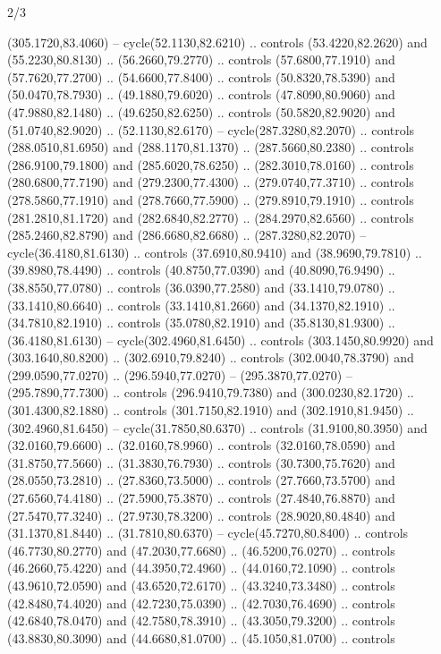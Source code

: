 \begin{flagdescription}{2/3}
\begin{scope}[xshift=0.5\flaglength,yshift=0.5\flagwidth,scale=\stretchfactor]
\begin{scope}[scale=0.001645\flagwidth,yshift=65mm,xshift=-63mm]
\begin{scope}[y=0.80pt, x=0.80pt, yscale=-1,]
\begin{scope}[cm={{1.33333,0.0,0.0,1.33333,(0.0,1e-05)}}]
  (305.1720,83.4060) -- cycle(52.1130,82.6210) .. controls (53.4220,82.2620) and
  (55.2230,80.8130) .. (56.2660,79.2770) .. controls (57.6800,77.1910) and
  (57.7620,77.2700) .. (54.6600,77.8400) .. controls (50.8320,78.5390) and
  (50.0470,78.7930) .. (49.1880,79.6020) .. controls (47.8090,80.9060) and
  (47.9880,82.1480) .. (49.6250,82.6250) .. controls (50.5820,82.9020) and
  (51.0740,82.9020) .. (52.1130,82.6170) -- cycle(287.3280,82.2070) .. controls
  (288.0510,81.6950) and (288.1170,81.1370) .. (287.5660,80.2380) .. controls
  (286.9100,79.1800) and (285.6020,78.6250) .. (282.3010,78.0160) .. controls
  (280.6800,77.7190) and (279.2300,77.4300) .. (279.0740,77.3710) .. controls
  (278.5860,77.1910) and (278.7660,77.5900) .. (279.8910,79.1910) .. controls
  (281.2810,81.1720) and (282.6840,82.2770) .. (284.2970,82.6560) .. controls
  (285.2460,82.8790) and (286.6680,82.6680) .. (287.3280,82.2070) --
  cycle(36.4180,81.6130) .. controls (37.6910,80.9410) and (38.9690,79.7810) ..
  (39.8980,78.4490) .. controls (40.8750,77.0390) and (40.8090,76.9490) ..
  (38.8550,77.0780) .. controls (36.0390,77.2580) and (33.1410,79.0780) ..
  (33.1410,80.6640) .. controls (33.1410,81.2660) and (34.1370,82.1910) ..
  (34.7810,82.1910) .. controls (35.0780,82.1910) and (35.8130,81.9300) ..
  (36.4180,81.6130) -- cycle(302.4960,81.6450) .. controls (303.1450,80.9920)
  and (303.1640,80.8200) .. (302.6910,79.8240) .. controls (302.0040,78.3790)
  and (299.0590,77.0270) .. (296.5940,77.0270) -- (295.3870,77.0270) --
  (295.7890,77.7300) .. controls (296.9410,79.7380) and (300.0230,82.1720) ..
  (301.4300,82.1880) .. controls (301.7150,82.1910) and (302.1910,81.9450) ..
  (302.4960,81.6450) -- cycle(31.7850,80.6370) .. controls (31.9100,80.3950) and
  (32.0160,79.6600) .. (32.0160,78.9960) .. controls (32.0160,78.0590) and
  (31.8750,77.5660) .. (31.3830,76.7930) .. controls (30.7300,75.7620) and
  (28.0550,73.2810) .. (27.8360,73.5000) .. controls (27.7660,73.5700) and
  (27.6560,74.4180) .. (27.5900,75.3870) .. controls (27.4840,76.8870) and
  (27.5470,77.3240) .. (27.9730,78.3200) .. controls (28.9020,80.4840) and
  (31.1370,81.8440) .. (31.7810,80.6370) -- cycle(45.7270,80.8400) .. controls
  (46.7730,80.2770) and (47.2030,77.6680) .. (46.5200,76.0270) .. controls
  (46.2660,75.4220) and (44.3950,72.4960) .. (44.0160,72.1090) .. controls
  (43.9610,72.0590) and (43.6520,72.6170) .. (43.3240,73.3480) .. controls
  (42.8480,74.4020) and (42.7230,75.0390) .. (42.7030,76.4690) .. controls
  (42.6840,78.0470) and (42.7580,78.3910) .. (43.3050,79.3200) .. controls
  (43.8830,80.3090) and (44.6680,81.0700) .. (45.1050,81.0700) .. controls

\end{scope}
\end{scope}
\end{scope}
\end{scope}
\end{flagdescription}
